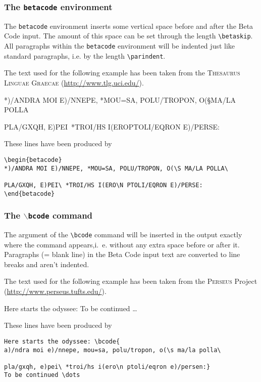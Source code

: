 \documentclass{article}
\begin{document}
\subsubsection{The \texttt{betacode} environment}
The \texttt{betacode} environment inserts some vertical space before and after the Beta Code input. The amount of this space can be set through the length \verb'\betaskip'. All paragraphs within the \texttt{betacode} environment will be indented just like standard paragraphs, i.e. by the length \verb=\parindent=.
 
The text used for the following example has been taken from the \textsc{Thesaurus Linguae Graecae} (\url{http://www.tlg.uci.edu/}).

\begin{betacode}
*)/ANDRA MOI E)/NNEPE, *MOU=SA, POLU/TROPON, O(\S MA/LA POLLA\

PLA/GXQH, E)PEI\ *TROI/HS I(ERO\N PTOLI/EQRON E)/PERSE:
\end{betacode}

These lines have been produced by
\begin{verbatim}
\begin{betacode}
*)/ANDRA MOI E)/NNEPE, *MOU=SA, POLU/TROPON, O(\S MA/LA POLLA\

PLA/GXQH, E)PEI\ *TROI/HS I(ERO\N PTOLI/EQRON E)/PERSE:
\end{betacode}
\end{verbatim}

\subsubsection{The \texttt{$\backslash$bcode} command}
The argument of the \verb'\bcode' command will be inserted in the output exactly where the command appears,\frenchspacing i.\ e. \nonfrenchspacing without any extra space before or after it. Paragraphs (= blank line) in the Beta Code input text are converted to line breaks and aren't indented.

The text used for the following example has been taken from the \textsc{Perseus} Project (\url{http://www.perseus.tufts.edu/}).\bigskip

Here starts the odyssee: 
To be continued \dots\bigskip

These lines have been produced by
\begin{verbatim}
Here starts the odyssee: \bcode{
a)/ndra moi e)/nnepe, mou=sa, polu/tropon, o(\s ma/la polla\

pla/gxqh, e)pei\ *troi/hs i(ero\n ptoli/eqron e)/persen:}
To be continued \dots
\end{verbatim}
\end{document}
